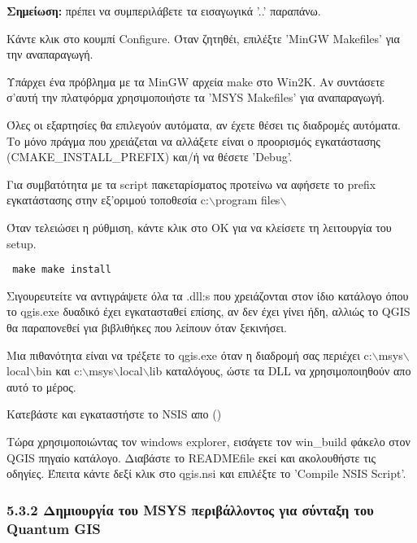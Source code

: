 \textbf{Σημείωση:} πρέπει να συμπεριλάβετε τα εισαγωγικά ’..’ παραπάνω.

Κάντε κλικ στο κουμπί Configure. Όταν ζητηθέι, επιλέξτε ’MinGW Makefiles’  για την αναπαραγωγή.

Υπάρχει ένα πρόβλημα με τα MinGW αρχεία make στο Win2K. Αν συντάσετε σ'αυτή την πλατφόρμα χρησιμοποιήστε τα  ’MSYS Makefiles’ για αναπαραγωγή.

Όλες οι εξαρτησίες θα επιλεγούν αυτόματα, αν έχετε θέσει τις διαδρομές αυτόματα. Το μόνο πράγμα που χρειάζεται να αλλάξετε είναι ο προορισμός εγκατάστασης (CMAKE\_INSTALL\_PREFIX) και/ή να θέσετε 'Debug'.

Για συμβατότητα με τα script πακεταρίσματος προτείνω να αφήσετε το prefix εγκατάστασης στην εξ'οριμού τοποθεσία c:$\backslash$program files$\backslash$

Όταν τελειώσει η ρύθμιση, κάντε κλικ στο ΟΚ για να κλείσετε τη λειτουργία του setup.

\begin{verbatim}
 make make install 
\end{verbatim}

Σιγουρευτείτε να αντιγράψετε όλα τα .dll:s που χρειάζονται στον ίδιο κατάλογο όπου το qgis.exe δυαδικό έχει εγκατασταθεί επίσης, αν δεν έχει γίνει ήδη, αλλιώς το QGIS θα παραπονεθεί για βιβλιθήκες που λείπουν όταν ξεκινήσει.

Μια πιθανότητα είναι να τρέξετε το qgis.exe όταν η διαδρομή σας περιέχει c:$\backslash$msys$\backslash$local$\backslash$bin και
c:$\backslash$msys$\backslash$local$\backslash$lib καταλόγους, ώστε τα DLL να χρησιμοποιηθούν απο αυτό το μέρος.

Κατεβάστε και εγκαταστήστε το NSIS απο ()

Τώρα χρησιμοποιώντας τον windows explorer, εισάγετε τον win\_build φάκελο στον QGIS πηγαίο κατάλογο. Διαβάστε το READMEfile εκεί και ακολουθήστε τις οδηγίες. Έπειτα κάντε δεξί κλικ στο qgis.nsi και επιλέξτε το 'Compile NSIS Script'. 

\hypertarget{toc17}{}
\subsubsection{5.3.2 Δημιουργία του MSYS περιβάλλοντος για σύνταξη του Quantum GIS}
